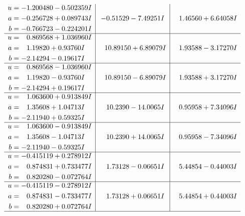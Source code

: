 \documentclass[1p]{elsarticle_modified}
\theoremstyle{definition}
\begin{document}
$$\begin{array}{c|c|c}
\begin{aligned}
u &= -1.200480 - 0.502359 I \\
a &= -0.256728 + 0.089743 I \\
b &= -0.766723 - 0.224201 I\end{aligned}
 & -0.51529 - 7.49251 I & \phantom{-}1.46560 + 6.64058 I \\ \hline\begin{aligned}
u &= \phantom{-}0.869568 + 1.036960 I \\
a &= \phantom{-}1.19820 + 0.93760 I \\
b &= -2.14294 - 0.19617 I\end{aligned}
 & \phantom{-}10.89150 + 6.89079 I & \phantom{-}1.93588 - 3.17270 I \\ \hline\begin{aligned}
u &= \phantom{-}0.869568 - 1.036960 I \\
a &= \phantom{-}1.19820 - 0.93760 I \\
b &= -2.14294 + 0.19617 I\end{aligned}
 & \phantom{-}10.89150 - 6.89079 I & \phantom{-}1.93588 + 3.17270 I \\ \hline\begin{aligned}
u &= \phantom{-}1.063600 + 0.913849 I \\
a &= \phantom{-}1.35608 + 1.04713 I \\
b &= -2.11940 + 0.59325 I\end{aligned}
 & \phantom{-}10.2390 - 14.0065 I & \phantom{-}0.95958 + 7.34096 I \\ \hline\begin{aligned}
u &= \phantom{-}1.063600 - 0.913849 I \\
a &= \phantom{-}1.35608 - 1.04713 I \\
b &= -2.11940 - 0.59325 I\end{aligned}
 & \phantom{-}10.2390 + 14.0065 I & \phantom{-}0.95958 - 7.34096 I \\ \hline\begin{aligned}
u &= -0.415119 + 0.278912 I \\
a &= \phantom{-}0.874831 + 0.733477 I \\
b &= \phantom{-}0.820280 - 0.072764 I\end{aligned}
 & \phantom{-}1.73128 - 0.06651 I & \phantom{-}5.44854 - 0.44003 I \\ \hline\begin{aligned}
u &= -0.415119 - 0.278912 I \\
a &= \phantom{-}0.874831 - 0.733477 I \\
b &= \phantom{-}0.820280 + 0.072764 I\end{aligned}
 & \phantom{-}1.73128 + 0.06651 I & \phantom{-}5.44854 + 0.44003 I\\
 \hline 
 \end{array}$$\newpage\newpage\renewcommand{\arraystretch}{1}
\end{document}
